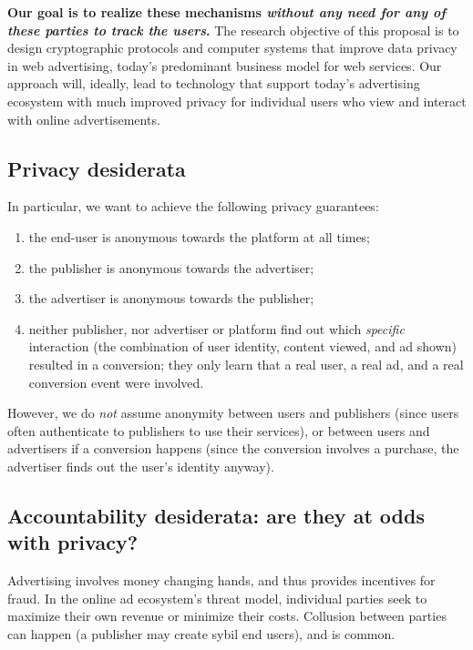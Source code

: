 \medskip
\noindent
\textbf{
Our goal is to realize these mechanisms \emph{without any need for any of these parties to track the users}.} 
The research objective of this proposal is to design cryptographic protocols and
computer systems that improve data privacy in web advertising, today's
predominant business model for web services.
%
Our approach will, ideally, lead to technology that support today's advertising
ecosystem with much improved privacy for individual users who view and
interact with online advertisements.
%

\medskip

\subsection{Privacy desiderata}

In particular, we want to achieve the following privacy guarantees:
\begin{enumerate}[nosep]
  \item the end-user is anonymous towards the platform at all times;
  \item the publisher is anonymous towards the advertiser;
  \item the advertiser is anonymous towards the publisher;
  \item neither publisher, nor advertiser or platform find out which \emph{specific} interaction (the combination of user identity, content viewed, and ad shown)
	resulted in a conversion; they only learn that a real user, a real ad, and a real conversion event were involved.
\end{enumerate}
%
However, we do \emph{not} assume anonymity between users and publishers (since users often authenticate to publishers to use their services), or between users and advertisers if a conversion happens (since the conversion involves a purchase, the advertiser finds out the user's identity anyway).
%


%









\subsection{Accountability desiderata: are they at odds with privacy?}
%
Advertising involves money changing hands, and thus provides incentives for
fraud.
%
In the online ad ecosystem's threat model, individual parties seek to maximize
their own revenue or minimize their costs.
%
Collusion between parties can happen (\eg a publisher may create sybil end
users), and is common.
%

